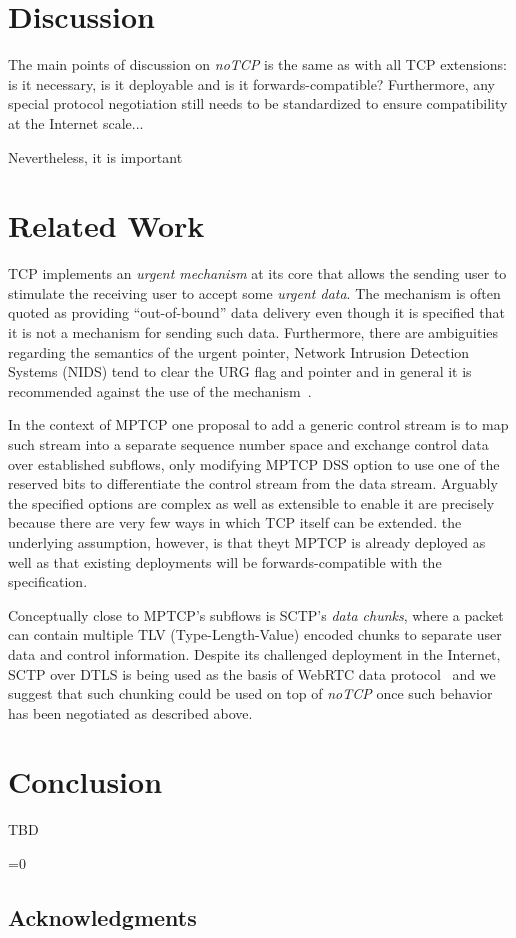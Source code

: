 \documentclass{sig-alternate-10pt}
\def\anon{1}        %
\begin{document}
\section{Discussion}

The main points of discussion on \emph{noTCP} is the same as with all TCP extensions: is it necessary, is it deployable and is it forwards-compatible? Furthermore, any special protocol negotiation still needs to be standardized to ensure compatibility at the Internet scale...

Nevertheless, it is important 



\section{Related Work}
\label{sec:related}

TCP implements an \emph{urgent mechanism} at its core that allows the sending user to stimulate the receiving user to accept some \emph{urgent data}. The mechanism is often quoted as providing ``out-of-bound'' data delivery even though it is specified that it is not a mechanism for sending such data. Furthermore, there are ambiguities regarding the semantics of the urgent pointer, Network Intrusion Detection Systems (NIDS) tend to clear the URG flag and pointer and in general it is recommended against the use of the mechanism~\cite{Gont:2011vi}.

In the context of MPTCP one proposal to add a generic control stream is to map such stream into a separate sequence number space and exchange control data over established subflows, only modifying MPTCP DSS option to use one of the reserved bits to differentiate the control stream from the data stream. Arguably the specified options are complex as well as extensible to enable it are precisely because there are very few ways in which TCP itself can be extended. the underlying assumption, however, is that theyt MPTCP is already deployed as well as that existing deployments will be forwards-compatible with the specification.

Conceptually close to MPTCP's subflows is SCTP's \emph{data chunks}, where a packet can contain multiple TLV (Type-Length-Value) encoded chunks to separate user data and control information. Despite its challenged deployment in the Internet, SCTP over DTLS is being used as the basis of WebRTC data protocol~\cite{Tuexen:wv} and we suggest that such chunking could be used on top of \emph{noTCP} once such behavior has been negotiated as described above.


\section{Conclusion}
TBD
%

\ifnum\anon=0
\subsection*{Acknowledgments}

\fi


\clearpage
{\footnotesize 


}

%
\end{document}
